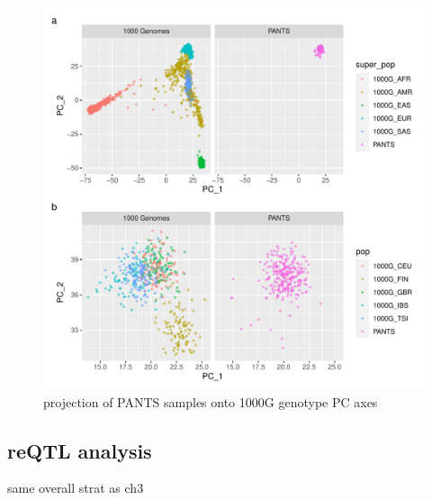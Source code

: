 \begin{outline}
\begin{figure}
    \centering
    \includegraphics[width=1.0\textwidth,page=1]{mainmatter/figures/chapter_04/pants_samples.sampleids_cleaned_to_lowercase.filtered.GRCh38.sorted.multiPANTS.projection_1000G_pca.pdf}
    \caption{projection of PANTS samples onto 1000G genotype PC axes}
    \label{fig:multipants_genotype_akt_1000g_pca}
\end{figure}

\subsection{reQTL analysis}

\1 same overall strat as ch3





\end{outline}
